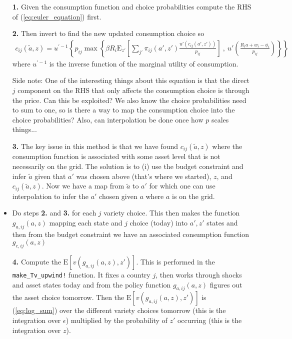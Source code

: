 \documentclass[12pt,pdftex]{article}
\begin{document}
\begin{onehalfspacing}
\begin{itemize}
\item[\textbf{1.}] Given the consumption function and choice probabilities compute the RHS of (\ref{eq:euler_equation}) first.

\item[\textbf{2.}] Then invert to find the new updated consumption choice so
\begin{align}
c_{ij}(\tilde a, z) = u^{' -1}\left\{ p_{ij} \max \left\{ \beta R_{i} \mathrm{E}_{z'} \left[ \sum_{j'} \pi_{ij}(a', z') \frac{u'(c_{ij}(a', z'))}{p_{ij}} \right] \ , \  u' \left( \frac{R_i a + w_i - \phi_{i}}{p_{ij}} \right) \right \} \right \}
\end{align}
where $u^{' -1}$ is the inverse function of the marginal utility of consumption.

Side note: One of the interesting things about this equation is that the direct $j$ component on the RHS that only affects the consumption choice is through the price. Can this be exploited? We also know the choice probabilities need to sum to one, so is there a way to map the consumption choice into the choice probabilities? Also, can interpolation be done once how $p$ scales things...

\item[\textbf{3.}] The key issue in this method is that we have found  $c_{ij}(\tilde a, z)$ where the consumption function is associated with some asset level that is not necessarily on the grid. The solution is to (i) use the budget constraint and infer $\tilde a$ given that $a'$ was chosen above (that's where we started), $z$, and $c_{ij}(\tilde a, z)$. Now we have a map from $\tilde a$ to $a'$ for which one can use interpolation to infer the $a'$ chosen given $a$ where $a$ is on the grid.

\item Do steps \textbf{2.} and \textbf{3.} for each $j$ variety choice. This then makes the function $g_{a,ij}(a,z)$ mapping each state and $j$ choice (today) into $a', z'$ states and then from the budget constraint we have an associated consumption function $g_{c,ij}(a,z)$

\item[\textbf{4.}] Compute the $\mathrm{E}\left[ v(g_{a,ij}(a,z), z') \right]$. This is performed in the {\tt{make\_Tv\_upwind!}} function. It fixes a country $j$, then works through shocks and asset states today and from the policy function $g_{a,ij}(a,z)$ figures out the asset choice tomorrow. Then the $\mathrm{E}\left[ v(g_{a,ij}(a,z), z') \right]$ is (\ref{eq:log_sum}) over the different variety choices tomorrow (this is the integration over $\epsilon$) multiplied by the probability of $z'$ occurring (this is the integration over $z$).


\end{itemize}
\end{onehalfspacing}
\end{document}
